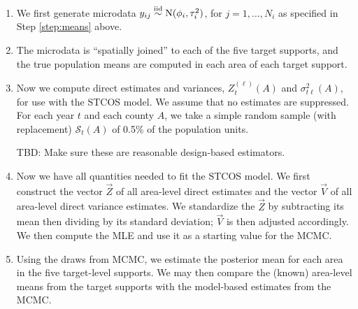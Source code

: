 \documentclass[12pt]{article}
\begin{document}
\begin{enumerate}
\item We first generate microdata $y_{ij} \stackrel{\text{iid}}{\sim} \text{N}(\phi_i, \tau_i^2)$, for $j = 1, \ldots, N_i$ as specified in Step \ref{step:means} above.

\item The microdata is ``spatially joined'' to each of the five target supports, and the true population means are computed in each area of each target support.

\item Now we compute direct estimates and variances, $Z^{(\ell)}_t(A)$ and $\sigma^2_{t\ell}(A)$, for use with the STCOS model. We assume that no estimates are suppressed. For each year $t$ and each county $A$, we take a simple random sample (with replacement) $\mathcal{S}_t(A)$ of 0.5\% of the population units. 
%
%
TBD: Make sure these are reasonable design-based estimators.

\item Now we have all quantities needed to fit the STCOS model. We first construct the vector $\vec{Z}$ of all area-level direct estimates and the vector $\vec{V}$ of all area-level direct variance estimates. We standardize the $\vec{Z}$ by subtracting its mean then dividing by its standard deviation; $\vec{V}$ is then adjusted accordingly. We then compute the MLE and use it as a starting value for the MCMC.

\item Using the draws from MCMC, we estimate the posterior mean for each area in the five target-level supports. We may then compare the (known) area-level means from the target supports with the model-based estimates from the MCMC.

\end{enumerate}
\end{document}
